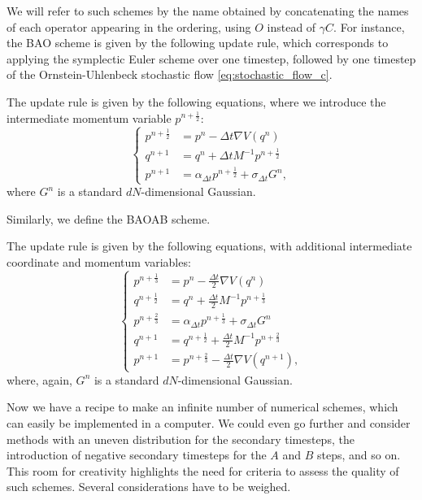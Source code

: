 We will refer to such schemes by the name obtained by concatenating the names of each operator appearing in the ordering, using $O$ instead of $\gamma C$.
For instance, the BAO scheme is given by the following update rule, which corresponds to applying the symplectic Euler scheme over one timestep, followed by one timestep of the Ornstein-Uhlenbeck stochastic flow \eqref{eq:stochastic_flow_c}.

    \begin{example}
        The update rule is given by the following equations, where we introduce the intermediate momentum variable $p^{n+\frac12}$:
        \begin{equation}\label{bao}
            \left\{\begin{aligned}
                 p^{n+\frac12} &=p^n -\Delta t\nabla V(q^n)\\
                 q^{n+1} &=q^n + \Delta t M^{-1}p^{n+\frac 12}\\
                 p^{n+1} &= \alpha_{\Delta t}p^{n+\frac12}+\sigma_{\Delta t}G^n,
            \end{aligned}\right.
        \end{equation}
        where $G^n$ is a standard $dN$-dimensional Gaussian.
    \end{example}
    Similarly, we define the BAOAB scheme.
    \begin{example}
        The update rule is given by the following equations, with additional intermediate coordinate and momentum variables:
        \begin{equation}\label{baoab}
            \left\{\begin{aligned}
                 p^{n+\frac13} &=p^n -\frac{\Delta t}{2}\nabla V(q^n)\\
                 q^{n+\frac12} &=q^n + \frac{\Delta t}{2} M^{-1}p^{n+\frac 13}\\
                 p^{n+\frac23} &=\alpha_{\Delta t}p^{n+\frac13}+\sigma_{\Delta t}G^n\\
                 q^{n+1} &=q^{n+\frac12} + \frac{\Delta t}{2} M^{-1}p^{n+\frac 23}\\
                 p^{n+1} &= p^{n+\frac23}-\frac{\Delta t}{2}\nabla V(q^{n+1}),
            \end{aligned}\right.
        \end{equation}
        where, again, $G^n$ is a standard $dN$-dimensional Gaussian.
    \end{example}
     Now we have a recipe to make an infinite number of numerical schemes, which can easily be implemented in a computer.
     We could even go further and consider methods with an uneven distribution for the secondary timesteps, the introduction of negative secondary timesteps for the $A$ and $B$ steps, and so on.
     This room for creativity highlights the need for criteria to assess the quality of such schemes. Several considerations have to be weighed.

